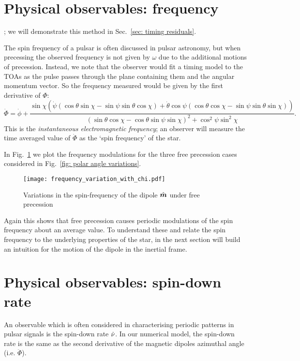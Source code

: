 \documentclass[../full_thesis/full_thesis.tex]{subfiles}
\begin{document}
\section{Physical observables: frequency}
; we will demonstrate this method in
Sec.~\ref{sec: timing residuals}.

The spin frequency of a pulsar is often discussed in pulsar astronomy, but when
precessing the observed frequency is not given by $\omega$ due to the
additional motions of precession. Instead, we note that the observer would
fit a timing model to the TOAs as the pulse passes through the plane containing
them and the angular momentum vector. So the frequency measured would be given
by the first derivative of $\Phi$:
\begin{equation}
\dot{\Phi} = \dot{\phi}
+ \frac{\sin\chi \left(
\dot{\psi} (\cos\theta\sin\chi - \sin \psi \sin \theta \cos\chi) +
\dot{\theta} \cos\psi (\cos\theta\cos\chi - \sin \psi \sin \theta \sin\chi)\right)
}{(\sin\theta \cos \chi - \cos \theta \sin \psi \sin \chi)^{2} + \cos^{2}\psi \sin^{2} \chi}.
\label{eqn: Phi_dot}
\end{equation}
This is the \emph{instantaneous electromagnetic frequency}; an observer
will measure the time averaged value of $\dot{\Phi}$ as the `spin frequency' of
the star.

In Fig.~\ref{fig: frequency variations} we plot the frequency modulations for the
three free precession cases considered in Fig.~\eqref{fig: polar angle variations}.
\begin{figure}[ht]
\centering
  \texttt{[image: frequency\_variation\_with\_chi.pdf]}
\caption{Variations in the spin-frequency of the dipole $\hat{\boldsymbol{m}}$ under free precession}
\label{fig: frequency variations}
\end{figure}
Again this shows that free precession causes periodic modulations of the spin
frequency about an average value. To understand these and relate the spin
frequency to the underlying properties of the star, in the next section will
build an intuition for the motion of the dipole in the inertial frame.




\section{Physical observables: spin-down rate}
An observable which is often considered in characterising periodic patterns in
pulsar signals is the spin-down rate $\dot{\nu}$. In our numerical model, the
spin-down rate is the same as the second derivative of the magnetic dipoles
azimuthal angle (i.e. $\ddot{\Phi}$).
\end{document}
